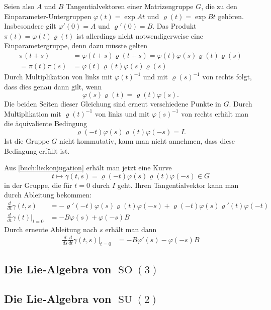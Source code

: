 Seien also $A$ und $B$ Tangentialvektoren einer Matrizengruppe $G$,
die zu den Einparameter-Untergruppen $\varphi(t)=\exp At$ und
$\varrho(t)=\exp Bt$ gehören.
Insbesondere gilt $\varphi'(0)=A$ und $\varrho'(0)=B$.
Das Produkt $\pi(t)=\varphi(t)\varrho(t)$ ist allerdings nicht notwendigerweise
eine Einparametergruppe, denn dazu müsste gelten
\begin{align*}
\pi(t+s)
&=
\varphi(t+s)\varrho(t+s)
=
\varphi(t)\varphi(s)\varrho(t)\varrho(s)
\\
=
\pi(t)\pi(s)
&=
\varphi(t)\varrho(t)\varphi(s)\varrho(s)
\end{align*}
Durch Multiplikation von links mit $\varphi(t)^{-1}$ und
mit $\varrho(s)^{-1}$ von rechts folgt, dass dies genau dann gilt,
wenn
\[
\varphi(s)\varrho(t)=\varrho(t)\varphi(s).
\]
Die beiden Seiten dieser Gleichung sind erneut verschiedene Punkte
in $G$.
Durch Multiplikation mit $\varrho(t)^{-1}$ von links und mit
$\varphi(s)^{-1}$ von rechts erhält man die äquivaliente
Bedingung
\begin{equation}
\varrho(-t)\varphi(s)\varrho(t)\varphi(-s)=I.
\label{buch:lie:konjugation}
\end{equation}
Ist die Gruppe $G$ nicht kommutativ, kann man nicht
annehmen, dass diese Bedingung erfüllt ist.

Aus \eqref{buch:lie:konjugation} erhält man jetzt eine Kurve
\[
t \mapsto \gamma(t,s) = \varrho(-t)\varphi(s)\varrho(t)\varphi(-s) \in G
\]
in der Gruppe, die für $t=0$ durch $I$ geht.
Ihren Tangentialvektor kann man durch Ableitung bekommen:
\begin{align*}
\frac{d}{dt}\gamma(t,s)
&=
-\varrho'(-t)\varphi(s)\varrho(t)\varphi(-s)
+\varrho(-t)\varphi(s)\varrho'(t)\varphi(-t)
\\
\frac{d}{dt}\gamma(t)\bigg|_{t=0}
&=
-B\varphi(s) + \varphi(-s)B
\end{align*}
Durch erneute Ableitung nach $s$  erhält man dann 
\begin{align*}
\frac{d}{ds} \frac{d}{dt}\gamma(t,s)\bigg|_{t=0}
&=
-B\varphi'(s) - \varphi(-s)B
\end{align*}

%
%
\subsection{Die Lie-Algebra von $\operatorname{SO}(3)$}

%
%
\subsection{Die Lie-Algebra von $\operatorname{SU}(2)$}




